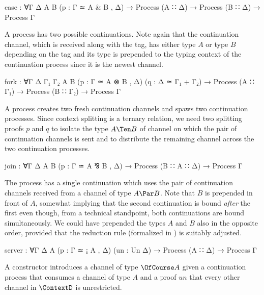 \begin{AgdaAlign}
\begin{code}
   case      : ∀{Γ Δ A B} (p : Γ ≃ A & B , Δ) →
               Process (A ∷ Δ) → Process (B ∷ Δ) → Process Γ
\end{code}

A  process has two possible continuations. Note
again that the continuation channel, which is received along with the tag, has
either type $A$ or type $B$ depending on the tag and its type is prepended to
the typing context of the continuation process since it is the newest channel.

\begin{code}
   fork      : ∀{Γ Δ Γ₁ Γ₂ A B} (p : Γ ≃ A ⊗ B , Δ) (q : Δ ≃ Γ₁ + Γ₂) →
               Process (A ∷ Γ₁) → Process (B ∷ Γ₂) → Process Γ
\end{code}

A  process creates two fresh continuation
channels and spaws two continuation processes. Since context splitting is a
ternary relation, we need two splitting proofs $p$ and $q$ to isolate the type
$A \Ten B$ of channel on which the pair of continuation channels is sent and to
distribute the remaining channel across the two continuation processes.

\begin{code}
   join      : ∀{Γ Δ A B} (p : Γ ≃ A ⅋ B , Δ) →
               Process (B ∷ A ∷ Δ) → Process Γ
\end{code}

The  process has a single continuation which uses
the pair of continuation channels received from a channel of type $A \Par B$.
Note that $B$ is prepended in front of $A$, somewhat implying that the second
continuation is bound \emph{after} the first even though, from a technical
standpoint, both continuations are bound simultaneously. We could have prepended
the types $A$ and $B$ also in the opposite order, provided that the reduction
rule \RFork (formalized in ) is suitably adjusted.

\begin{code}
   server    : ∀{Γ Δ A} (p : Γ ≃ ¡ A , Δ) (un : Un Δ) →
               Process (A ∷ Δ) → Process Γ
\end{code}

A  constructor introduces a channel of type
$\OfCourse A$ given a continuation process that consumes a channel of type $A$
and a proof $\mathit{un}$ that every other channel in $\ContextD$ is
unrestricted.


\end{AgdaAlign}

